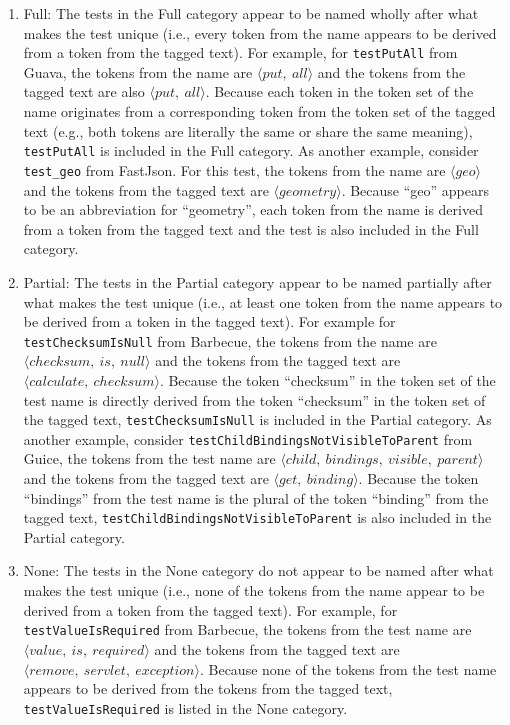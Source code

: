 \begin{enumerate}

\item Full: The tests in the Full category appear to be named wholly after what makes the test unique (i.e., every token from the name appears to be derived from a token from the tagged text).
%
For example, for \texttt{test\-Put\-All} from Guava, the tokens from the name are $\langle put,~all \rangle$ and the tokens from the tagged text are also $\langle put,~all \rangle$.
%
Because each token in the token set of the name originates from a corresponding token from the token set of the tagged text (e.g., both tokens are literally the same or share the same meaning), \texttt{test\-Put\-All} is included in the Full category.
%
As another example, consider \texttt{test\_geo} from FastJson.
%
For this test, the tokens from the name are $\langle geo \rangle$ and the tokens from the tagged text are $\langle geometry \rangle$.
%
Because \enquote{geo} appears to be an abbreviation for \enquote{geometry}, each token from the name is derived from a token from the tagged text and the test is also included in the Full category.

\item Partial: The tests in the Partial category appear to be named partially after what makes the test unique (i.e., at least one token from the name appears to be derived from a token in the tagged text).
%
For example for \texttt{test\-Checksum\-Is\-Null} from Barbecue, the tokens from the name are $\langle checksum,~is,~null \rangle$ and the tokens from the tagged text are $\langle calculate,~checksum \rangle$.
%
Because the token \enquote{checksum} in the token set of the test name is directly derived from the token \enquote{checksum} in the token set of the tagged text, \texttt{test\-Checksum\-Is\-Null} is included in the Partial category.
%
As another example, consider \texttt{test\-Child\-Bindings\-Not\-Visible\-To\-Parent} from Guice, the tokens from the test name are $\langle child,~bindings,~visible,~parent \rangle$ and the tokens from the tagged text are $\langle get,~binding \rangle$.
%
Because the token \enquote{bindings} from the test name is the plural of the token \enquote{binding} from the tagged text, \texttt{test\-Child\-Bindings\-Not\-Visible\-To\-Parent} is also included in the Partial category.

\item None: The tests in the None category do not appear to be named after what makes the test unique (i.e., none of the tokens from the name appear to be derived from a token from the tagged text).
%
For example, for \texttt{test\-Value\-Is\-Required} from Barbecue, the tokens from the test name are $\langle value,~is,~required \rangle$ and the tokens from the tagged text are $\langle remove,~servlet,~exception \rangle$.
%
Because none of the tokens from the test name appears to be derived from the tokens from the tagged text, \texttt{test\-Value\-Is\-Required} is listed in the None category.
\end{enumerate}

